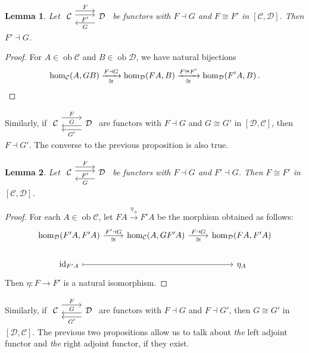 \documentclass[a4paper,11pt]{article}
\theoremstyle{break_italics}
\newtheorem*{lemma*}{Lemma}
\theoremstyle{break_upright}
\theoremstyle{remark}
\newcommand{\id}{\mathrm{id}}
\newcommand{\ob}{\operatorname{ob}}
\newcommand{\C}{\mathcal{C}}
\newcommand{\D}{\mathcal{D}}
\begin{document}
\begin{lemma*}
	Let $\begin{tikzcd}
\C \arrow[r, "F", shift left=3] \arrow[r, "F'"', shift left] & \D \arrow[l, "G", shift left=3]
\end{tikzcd}$ be functors with $F \dashv G$ and $F \cong F'$ in $[\C,\D]$. Then $F' 
\dashv G$.
\end{lemma*}
\begin{proof}
	For $A \in \ob\C$ and $B \in \ob\D$, we have natural bijections
	\[
		\hom_\C(A, GB) \xrightarrow[\cong]{F\dashv G} \hom_\D(FA, B) \xrightarrow[\cong]{F \cong F'} \hom_\D(F'A, B)\,. \qedhere
	\]
\end{proof}

Similarly, if $\begin{tikzcd}
\C \arrow[r, "F", shift left=3] & \D \arrow[l, "G"', shift left] \arrow[l, "G'", shift left=3]
\end{tikzcd}$ are functors with $F \dashv G$ and $G \cong G'$ in $[\D,\C]$, then $F \dashv G'$. The converse to the previous proposition is also true.


\begin{lemma*}
	Let $\begin{tikzcd}
\C \arrow[r, "F", shift left=3] \arrow[r, "F'"', shift left] & \D \arrow[l, "G", shift left=3]
\end{tikzcd}$ be functors with $F \dashv G$ and $F' \dashv G$. Then $F \cong F'$ in $[\C,\D]$.
\end{lemma*}
\begin{proof}
For each $A \in \ob\C$, let $FA \xrightarrow{\eta_A} F'A$ be the morphism obtained as follows:
\[
\begin{tikzcd}
{\hom_\D(F'A,F'A)} \arrow[r, "F' \dashv G","\cong"'] & {\hom_\C(A, GF'A)} \arrow[r, "F \dashv G", "\cong"'] & {\hom_\D(FA,F'A)} \\
\id_{F'A} \arrow[rr, maps to]           &                                  & \eta_A       
\end{tikzcd}
\]
Then $\eta \colon F \to F'$ is a natural isomorphism.
\end{proof}

Similarly, if $\begin{tikzcd}
\C \arrow[r, "F", shift left=3] & \D \arrow[l, "G"', shift left] \arrow[l, "G'", shift left=3]
\end{tikzcd}$ are functors with $F \dashv G$ and $F \dashv G'$, then $G \cong G'$ in $[\D,\C]$. The previous two propositions allow us to talk about \textit{the} left adjoint functor and \textit{the} right adjoint functor, if they exist.
\end{document}
